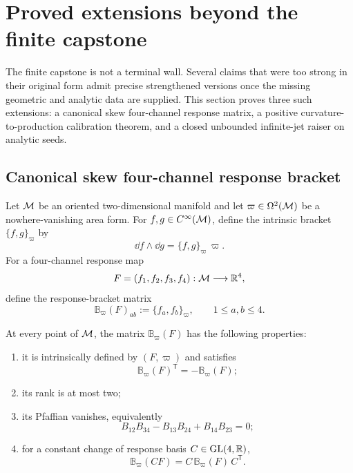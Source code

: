 \section{Proved extensions beyond the finite capstone}
\label{sec:proved-extensions}

The finite capstone is not a terminal wall.  Several claims that were too strong in their original form admit precise strengthened versions once the missing geometric and analytic data are supplied.  This section proves three such extensions: a canonical skew four-channel response matrix, a positive curvature-to-production calibration theorem, and a closed unbounded infinite-jet raiser on analytic seeds.

\subsection{Canonical skew four-channel response bracket}

Let $\mathcal M$ be an oriented two-dimensional manifold and let $\varpi\in\Omega^2(\mathcal M)$ be a nowhere-vanishing area form.  For $f,g\in C^\infty(\mathcal M)$, define the intrinsic bracket $\{f,g\}_\varpi$ by
\begin{equation}
\dd f\wedge\dd g
=\{f,g\}_\varpi\,\varpi.
\label{eq:area-bracket}
\end{equation}
For a four-channel response map
\[
F=(f_1,f_2,f_3,f_4):\mathcal M\longrightarrow\mathbb R^4,
\]
define the response-bracket matrix
\begin{equation}
\mathbb B_\varpi(F)_{ab}
:=\{f_a,f_b\}_\varpi,
\qquad 1\le a,b\le4.
\label{eq:response-bracket-matrix}
\end{equation}

\begin{theorem}
At every point of $\mathcal M$, the matrix $\mathbb B_\varpi(F)$ has the following properties:
\begin{enumerate}[label=(\roman*)]
\item it is intrinsically defined by $(F,\varpi)$ and satisfies
\[
\mathbb B_\varpi(F)^{\mathsf T}=-\mathbb B_\varpi(F);
\]
\item its rank is at most two;
\item its Pfaffian vanishes, equivalently
\begin{equation}
B_{12}B_{34}-B_{13}B_{24}+B_{14}B_{23}=0;
\label{eq:plucker-response}
\end{equation}
\item for a constant change of response basis $C\in\mathrm{GL}(4,\mathbb R)$,
\begin{equation}
\mathbb B_\varpi(CF)
=C\,\mathbb B_\varpi(F)\,C^{\mathsf T}.
\label{eq:bracket-congruence}
\end{equation}
\end{enumerate}
\end{theorem}

